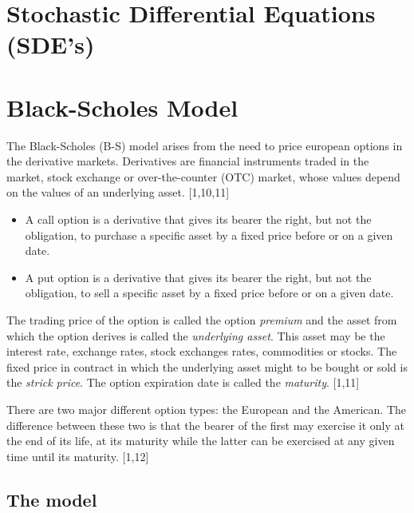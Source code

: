 \documentclass[12pt,twoside]{reedthesis}
\theoremstyle{definition}
\theoremstyle{definition}
\theoremstyle{remark}
\begin{document}
  \section{Stochastic Differential Equations
  (SDE's)}\label{stochastic-differential-equations-sdes}
  
  \section{Black-Scholes Model}\label{black-scholes-model}
  
  The Black-Scholes (B-S) model arises from the need to price european
  options in the derivative markets. Derivatives are financial instruments
  traded in the market, stock exchange or over-the-counter (OTC) market,
  whose values depend on the values of an underlying asset. {[}1,10,11{]}
  \begin{itemize}
  \item
    A call option is a derivative that gives its bearer the right, but not
    the obligation, to purchase a specific asset by a fixed price before
    or on a given date.
  \item
    A put option is a derivative that gives its bearer the right, but not
    the obligation, to sell a specific asset by a fixed price before or on
    a given date.
  \end{itemize}
  The trading price of the option is called the option \emph{premium} and
  the asset from which the option derives is called the \emph{underlying
  asset}. This asset may be the interest rate, exchange rates, stock
  exchanges rates, commodities or stocks. The fixed price in contract in
  which the underlying asset might to be bought or sold is the
  \emph{strick price}. The option expiration date is called the
  \emph{maturity}. {[}1,11{]}
  
  There are two major different option types: the European and the
  American. The difference between these two is that the bearer of the
  first may exercise it only at the end of its life, at its maturity while
  the latter can be exercised at any given time until its maturity.
  {[}1,12{]}
  
  \subsection{The model}\label{the-model}
  
\end{document}
